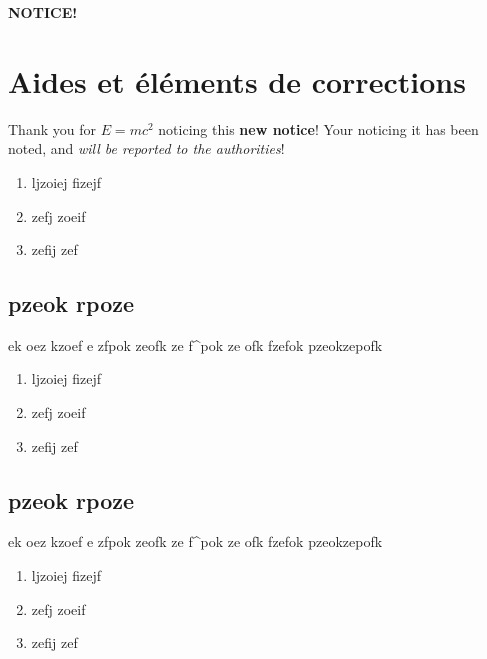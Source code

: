 \documentclass[
]{book}
\providecommand{\tightlist}{%
  \setlength{\itemsep}{0pt}\setlength{\parskip}{0pt}}
\def\tightlist{}
\begin{document}
\begin{blackbox}

\begin{center}
\textbf{NOTICE!}

\end{center}

\hypertarget{aides-et-uxe9luxe9ments-de-corrections}{%
\section*{Aides et éléments de corrections}\label{aides-et-uxe9luxe9ments-de-corrections}}

Thank you for \(E=mc^2\) noticing this \textbf{new notice}! Your noticing it has
been noted, and \emph{will be reported to the authorities}!

\begin{enumerate}
\def\labelenumi{\arabic{enumi}.}
\tightlist
\item
  ljzoiej fizejf
\item
  zefj zoeif
\item
  zefij zef
\end{enumerate}

\hypertarget{pzeok-rpoze}{%
\subsection{pzeok rpoze}\label{pzeok-rpoze}}

ek oez kzoef
e zfpok zeofk
ze f\^{}pok ze ofk
fzefok pzeokzepofk

\begin{enumerate}
\def\labelenumi{\arabic{enumi}.}
\tightlist
\item
  ljzoiej fizejf
\item
  zefj zoeif
\item
  zefij zef
\end{enumerate}

\hypertarget{pzeok-rpoze-1}{%
\subsection{pzeok rpoze}\label{pzeok-rpoze-1}}

ek oez kzoef
e zfpok zeofk
ze f\^{}pok ze ofk
fzefok pzeokzepofk

\begin{enumerate}
\def\labelenumi{\arabic{enumi}.}
\tightlist
\item
  ljzoiej fizejf
\item
  zefj zoeif
\item
  zefij zef
\end{enumerate}


\end{blackbox}
\end{document}
